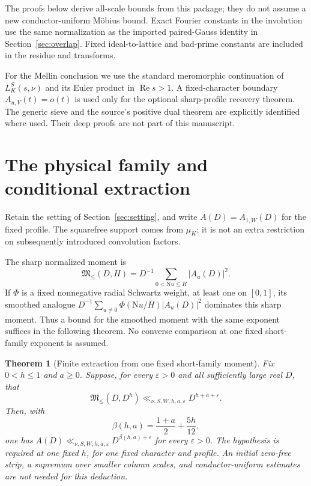 \documentclass[11pt]{article}
\numberwithin{equation}{section}
\newtheorem{theorem}{Theorem}[section]
\theoremstyle{definition}
\theoremstyle{remark}
\newcommand{\N}{\mathrm N}
\newcommand{\muK}{\mu_K}
\newcommand{\Mfrak}{\mathfrak M}
\newcommand{\eps}{\varepsilon}
\newcommand{\Rea}{\operatorname{Re}}
\begin{document}
The proofs below derive all-scale bounds from this package; they do
not assume a new conductor-uniform M\"obius bound.
Exact Fourier constants in the involution use the same normalization
as the imported paired-Gauss identity in
Section~\ref{sec:overlap}. Fixed ideal-to-lattice and bad-prime constants
are included in the residue and transforms.

For the Mellin conclusion we use the standard meromorphic continuation
of \(L_K^S(s,\nu)\) and its Euler product in \(\Rea s>1\).
A fixed-character boundary \(A_{u,V}(t)=o(t)\) is used only for the
optional sharp-profile recovery theorem. The generic sieve and the
source's positive dual theorem are explicitly identified where used.
Their deep proofs are not part of this manuscript.


\section{The physical family and conditional extraction}
\label{sec:physical-extraction}

Retain the setting of Section~\ref{sec:setting}, and write
\(A(D)=A_{1,W}(D)\) for the fixed profile.
The squarefree support comes from \(\muK\); it is not an extra
restriction on subsequently introduced convolution factors.

The sharp normalized moment is
\[
 \Mfrak_{\le}(D,H)=D^{-1}\sum_{0<\N u\le H}|A_u(D)|^2.
\]
If $\Phi$ is a fixed nonnegative radial Schwartz weight, at least one
on $[0,1]$, its smoothed analogue
$D^{-1}\sum_{u\ne0}\Phi(\N u/H)|A_u(D)|^2$ dominates this sharp moment.
Thus a bound for the smoothed moment with the same exponent suffices in
the following theorem. No converse comparison at one fixed short-family
exponent is assumed.

\begin{theorem}[Finite extraction from one fixed short-family moment]
\label{thm:finite-extraction}
Fix $0<h\le1$ and $a\ge0$. Suppose, for every $\eps>0$ and all
sufficiently large real $D$, that
\begin{equation}\label{eq:short-moment-hypothesis}
 \Mfrak_{\le}(D,D^h)\ll_{\nu,S,W,h,a,\eps}
 D^{h+a+\eps}.
\end{equation}
Then, with
\[
 \beta(h,a)=\frac{1+a}{2}+\frac{5h}{12},
\]
one has $A(D)\ll_{\nu,S,W,h,a,\eps}
D^{\beta(h,a)+\eps}$ for every $\eps>0$.
The hypothesis is required at one fixed $h$, for one fixed character
and profile. An initial zero-free strip, a supremum over smaller column
scales, and conductor-uniform estimates are not needed for this deduction.
\end{theorem}
\end{document}
